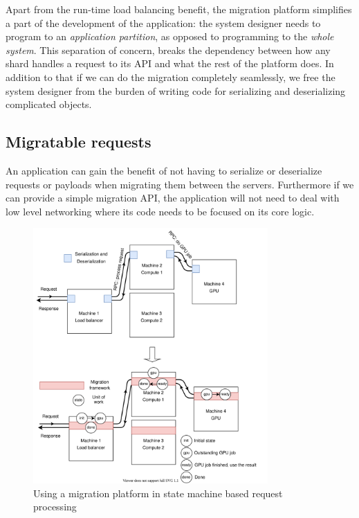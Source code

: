 Apart from the run-time load balancing benefit, the
    migration platform simplifies a part of the development of the
    application: the system designer needs to program to an
    \emph{application partition}, as opposed to programming to the
    \emph{whole system}. This separation of concern,
    breaks the dependency between how
    any shard handles a request to its API and what the rest of the
    platform does. In addition to that if we can do the migration completely
    seamlessly, we free the system designer from the burden of
    writing code for serializing and deserializing complicated objects.



\subsection{Migratable requests}
An application can gain the benefit of not having to serialize or deserialize
requests or payloads when migrating them between the servers. Furthermore if
we can provide a simple migration API, the application will not need to deal
with low level networking where its code needs to be focused on its core logic.


\begin{figure}[t]
\centering
{}
\includegraphics[width=0.8\textwidth]{migration-transport.drawio}
\caption{
    Using a migration platform in state machine based request processing
}
\label{fig:migrationtransport}
\end{figure}


